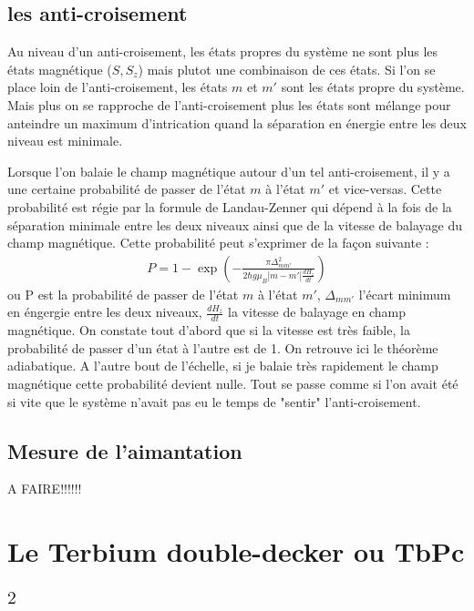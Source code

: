 \subsection{les anti-croisement}
Au niveau d'un anti-croisement, les états propres du système ne sont plus les états magnétique ($S,S_z$) mais plutot une combinaison de ces états. Si l'on se place loin de l'anti-croisement, les états $m$ et $m'$ sont les états propre du système. Mais plus on se rapproche de l'anti-croisement plus les états sont mélange pour anteindre un maximum d'intrication quand la séparation en énergie entre les deux niveau est minimale.

Lorsque l'on balaie le champ magnétique autour d'un tel anti-croisement, il y a une certaine probabilité de passer de l'état $m$ à l'état $m'$ et vice-versas. Cette probabilité est régie par la formule de Landau-Zenner qui dépend à la fois de la séparation minimale entre les deux niveaux ainsi que de la vitesse de balayage du champ magnétique. Cette probabilité peut s'exprimer de la façon suivante :
\begin{eqnarray}
P = 1 - \exp \left( -\frac{\pi \Delta^2_{mm'}}{2 \hbar g \mu_B |m-m'|\frac{dH_z}{dt}} \right)
\end{eqnarray}
ou P est la probabilité de passer de l'état $m$ à l'état $m'$, $\Delta_{mm'}$ l'écart minimum en éngergie entre les deux niveaux, $\frac{dH_z}{dt}$ la vitesse de balayage en champ magnétique. On constate tout d'abord que si la vitesse est très faible, la probabilité de passer d'un état à l'autre est de 1. On retrouve ici le théorème adiabatique. A l'autre bout de l'échelle, si je balaie très rapidement le champ magnétique cette probabilité devient nulle. Tout se passe comme si l'on avait été si vite que le système n'avait pas eu le temps de "sentir" l'anti-croisement.

\subsection{Mesure de l'aimantation}

A FAIRE!!!!!!

\section{Le Terbium double-decker ou TbPc$_2$}

